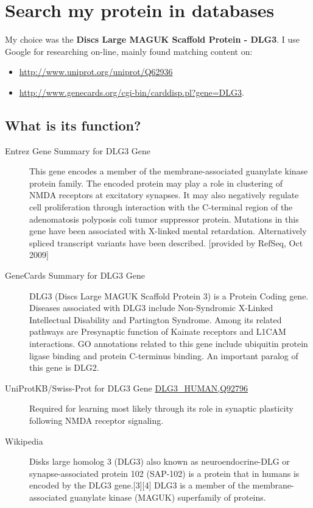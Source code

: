 \chapter{Search my protein in databases}
My choice was the \textbf{Discs Large MAGUK Scaffold Protein - DLG3}.
I use Google for researching on-line, mainly found matching content on:
\begin{itemize}
\item \href{Uniprot.org}{http://www.uniprot.org/uniprot/Q62936}
\item \href{GeneCards.org}{http://www.genecards.org/cgi-bin/carddisp.pl?gene=DLG3}.
\end{itemize}

\section{What is its function?}
\begin{description}
\item[Entrez Gene Summary for DLG3 Gene]

    This gene encodes a member of the membrane-associated guanylate kinase protein family. The encoded protein may play a role in clustering of NMDA receptors at excitatory synapses. It may also negatively regulate cell proliferation through interaction with the C-terminal region of the adenomatosis polyposis coli tumor suppressor protein. Mutations in this gene have been associated with X-linked mental retardation. Alternatively spliced transcript variants have been described. [provided by RefSeq, Oct 2009]

\item[GeneCards Summary for DLG3 Gene]

DLG3 (Discs Large MAGUK Scaffold Protein 3) is a Protein Coding gene. Diseases associated with DLG3 include Non-Syndromic X-Linked Intellectual Disability and Partington Syndrome. Among its related pathways are Presynaptic function of Kainate receptors and L1CAM interactions. GO annotations related to this gene include ubiquitin protein ligase binding and protein C-terminus binding. An important paralog of this gene is DLG2.

\item[UniProtKB/Swiss-Prot for DLG3 Gene \url{DLG3_HUMAN,Q92796}]

Required for learning most likely through its role in synaptic plasticity following NMDA receptor signaling.

\item[Wikipedia]
Disks large homolog 3 (DLG3) also known as neuroendocrine-DLG or synapse-associated protein 102 (SAP-102) is a protein that in humans is encoded by the DLG3 gene.[3][4] DLG3 is a member of the membrane-associated guanylate kinase (MAGUK) superfamily of proteins.
\end{description}

